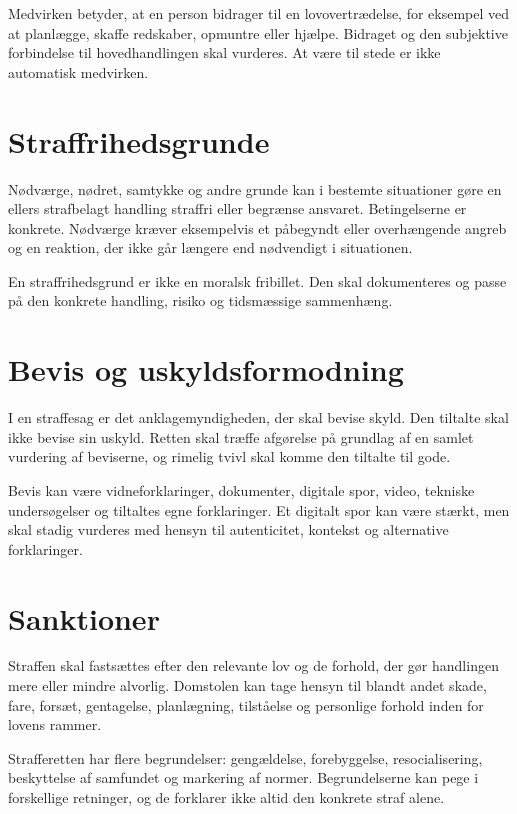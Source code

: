 Medvirken betyder, at en person bidrager til en lovovertrædelse, for eksempel ved at planlægge, skaffe redskaber, opmuntre eller hjælpe. Bidraget og den subjektive forbindelse til hovedhandlingen skal vurderes. At være til stede er ikke automatisk medvirken.

\section{Straffrihedsgrunde}

Nødværge, nødret, samtykke og andre grunde kan i bestemte situationer gøre en ellers strafbelagt handling straffri eller begrænse ansvaret. Betingelserne er konkrete. Nødværge kræver eksempelvis et påbegyndt eller overhængende angreb og en reaktion, der ikke går længere end nødvendigt i situationen.

En straffrihedsgrund er ikke en moralsk fribillet. Den skal dokumenteres og passe på den konkrete handling, risiko og tidsmæssige sammenhæng.

\section{Bevis og uskyldsformodning}

I en straffesag er det anklagemyndigheden, der skal bevise skyld. Den tiltalte skal ikke bevise sin uskyld. Retten skal træffe afgørelse på grundlag af en samlet vurdering af beviserne, og rimelig tvivl skal komme den tiltalte til gode.

Bevis kan være vidneforklaringer, dokumenter, digitale spor, video, tekniske undersøgelser og tiltaltes egne forklaringer. Et digitalt spor kan være stærkt, men skal stadig vurderes med hensyn til autenticitet, kontekst og alternative forklaringer.

\section{Sanktioner}

Straffen skal fastsættes efter den relevante lov og de forhold, der gør handlingen mere eller mindre alvorlig. Domstolen kan tage hensyn til blandt andet skade, fare, forsæt, gentagelse, planlægning, tilståelse og personlige forhold inden for lovens rammer.

Strafferetten har flere begrundelser: gengældelse, forebyggelse, resocialisering, beskyttelse af samfundet og markering af normer. Begrundelserne kan pege i forskellige retninger, og de forklarer ikke altid den konkrete straf alene.

